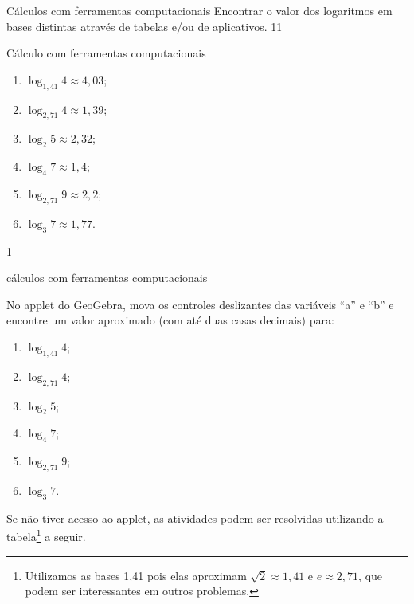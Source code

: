 \clearpage

\begin{objectives}{Cálculos com ferramentas computacionais}
{
	Encontrar o valor dos logaritmos em bases distintas através de tabelas e/ou de aplicativos.
	}{1}{1}
\end{objectives}
\begin{answer}{Cálculo com ferramentas computacionais}
{
	\begin{enumerate}
	\item $\log_{1,41} 4 \approx 4,03$;
	\item $\log_{2,71} 4 \approx 1,39$;
	\item $\log_{2} 5 \approx 2,32$;
	\item $\log_{4} 7 \approx 1,4$;
	\item $\log_{2,71} 9 \approx 2,2$;
	\item $\log_{3} 7 \approx 1,77$.
	\end{enumerate}
}{1}
\end{answer}

\begin{task}{cálculos com ferramentas computacionais}

No applet do GeoGebra, mova os controles deslizantes das variáveis “a” e “b” e encontre um valor aproximado (com até duas casas decimais) para:
\begin{multicols}{2}
\begin{enumerate}
\item $\log_{1,41} 4$;
\item $\log_{2,71} 4$;
\item $\log_2 5$;
\item $\log_4 7$;
\item $\log_{2,71} 9$;
\item $\log_3 7$.
\end{enumerate}
\end{multicols}
\end{task}


Se não tiver acesso ao applet, as atividades podem ser resolvidas utilizando a tabela\footnote{Utilizamos as bases 1,41 pois elas aproximam $\sqrt{2} \approx 1,41$ e $e \approx 2,71$, que podem ser interessantes em outros problemas.} a seguir.


